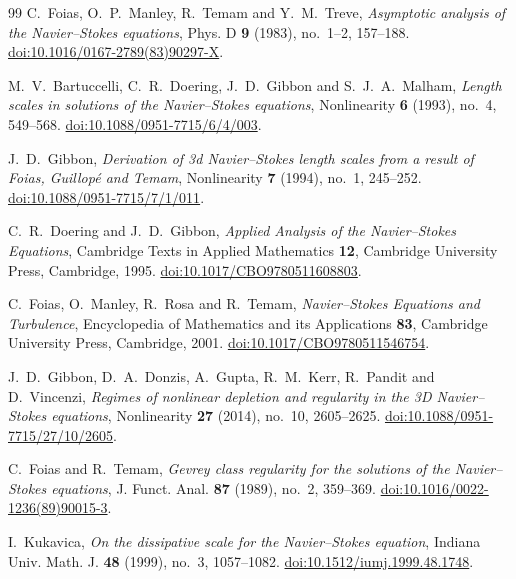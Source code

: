 \documentclass[11pt]{article}
\theoremstyle{definition}
\begin{document}
\begin{thebibliography}{99}
C.~Foias, O.~P.~Manley, R.~Temam and Y.~M.~Treve,
\emph{Asymptotic analysis of the Navier--Stokes equations},
Phys. D \textbf{9} (1983), no.~1--2, 157--188.
\href{https://doi.org/10.1016/0167-2789(83)90297-X}{doi:10.1016/0167-2789(83)90297-X}.

M.~V.~Bartuccelli, C.~R.~Doering, J.~D.~Gibbon and S.~J.~A.~Malham,
\emph{Length scales in solutions of the Navier--Stokes equations},
Nonlinearity \textbf{6} (1993), no.~4, 549--568.
\href{https://doi.org/10.1088/0951-7715/6/4/003}{doi:10.1088/0951-7715/6/4/003}.

J.~D.~Gibbon,
\emph{Derivation of 3d Navier--Stokes length scales from a result of Foias,
Guillop\'e and Temam},
Nonlinearity \textbf{7} (1994), no.~1, 245--252.
\href{https://doi.org/10.1088/0951-7715/7/1/011}{doi:10.1088/0951-7715/7/1/011}.

C.~R.~Doering and J.~D.~Gibbon,
\emph{Applied Analysis of the Navier--Stokes Equations},
Cambridge Texts in Applied Mathematics \textbf{12},
Cambridge University Press, Cambridge, 1995.
\href{https://doi.org/10.1017/CBO9780511608803}{doi:10.1017/CBO9780511608803}.

C.~Foias, O.~Manley, R.~Rosa and R.~Temam,
\emph{Navier--Stokes Equations and Turbulence},
Encyclopedia of Mathematics and its Applications \textbf{83},
Cambridge University Press, Cambridge, 2001.
\href{https://doi.org/10.1017/CBO9780511546754}{doi:10.1017/CBO9780511546754}.

J.~D.~Gibbon, D.~A.~Donzis, A.~Gupta, R.~M.~Kerr, R.~Pandit and D.~Vincenzi,
\emph{Regimes of nonlinear depletion and regularity in the 3D Navier--Stokes
equations},
Nonlinearity \textbf{27} (2014), no.~10, 2605--2625.
\href{https://doi.org/10.1088/0951-7715/27/10/2605}{doi:10.1088/0951-7715/27/10/2605}.

C.~Foias and R.~Temam,
\emph{Gevrey class regularity for the solutions of the Navier--Stokes
equations},
J. Funct. Anal. \textbf{87} (1989), no.~2, 359--369.
\href{https://doi.org/10.1016/0022-1236(89)90015-3}{doi:10.1016/0022-1236(89)90015-3}.

I.~Kukavica,
\emph{On the dissipative scale for the Navier--Stokes equation},
Indiana Univ. Math. J. \textbf{48} (1999), no.~3, 1057--1082.
\href{https://doi.org/10.1512/iumj.1999.48.1748}{doi:10.1512/iumj.1999.48.1748}.

\end{thebibliography}
\end{document}
